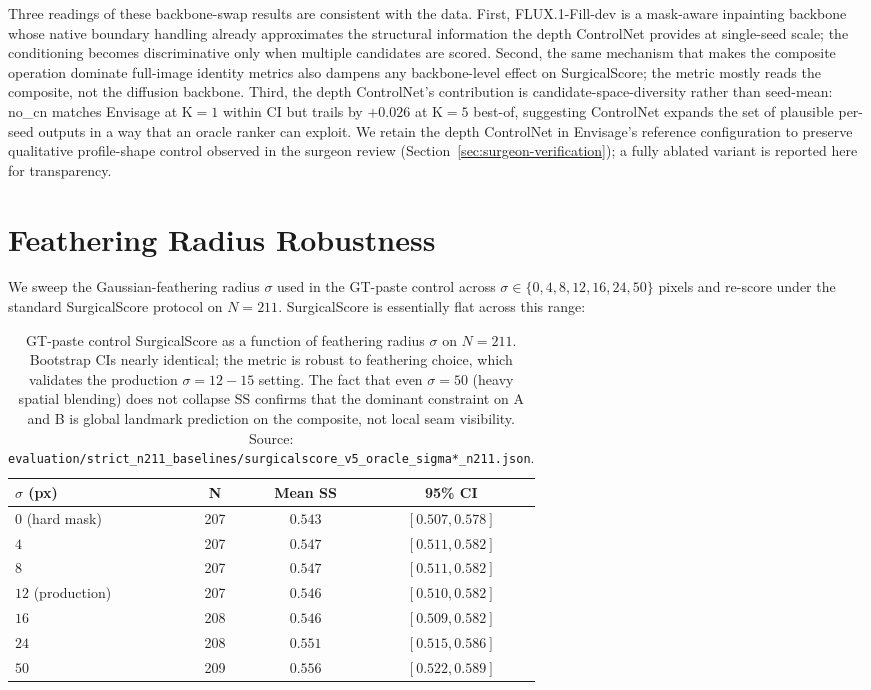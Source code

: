 \documentclass{article}
\newcommand{\method}{Envisage}
\begin{document}
\noindent Three readings of these backbone-swap results are consistent with
the data. First, FLUX.1-Fill-dev is a mask-aware inpainting backbone whose
native boundary handling already approximates the structural information
the depth ControlNet provides at single-seed scale; the conditioning
becomes discriminative only when multiple candidates are scored. Second,
the same mechanism that makes the composite operation dominate full-image
identity metrics also dampens any backbone-level effect on SurgicalScore;
the metric mostly reads the composite, not the diffusion backbone.
Third, the depth ControlNet's contribution is candidate-space-diversity
rather than seed-mean: no\_cn matches \method{} at K$=1$ within CI but
trails by $+0.026$ at K$=5$ best-of, suggesting ControlNet expands the
set of plausible per-seed outputs in a way that an oracle ranker can
exploit. We retain the depth ControlNet in \method{}'s reference
configuration to preserve qualitative profile-shape control observed in
the surgeon review (Section~\ref{sec:surgeon-verification}); a fully
ablated variant is reported here for transparency.

\section{Feathering Radius Robustness}
\label{app:sigma_sweep}

We sweep the Gaussian-feathering radius $\sigma$ used in the GT-paste control
across $\sigma\in\{0,4,8,12,16,24,50\}$ pixels and re-score under the standard
SurgicalScore protocol on $N{=}211$. SurgicalScore is essentially
flat across this range:

\begin{table}[h]
\centering
\small
\caption{GT-paste control SurgicalScore as a function of feathering radius
$\sigma$ on $N{=}211$. Bootstrap CIs nearly identical; the metric is
robust to feathering choice, which validates the production
$\sigma{=}12{-}15$ setting. The fact that even $\sigma{=}50$ (heavy spatial
blending) does not collapse SS confirms that the dominant constraint on
A and B is global landmark prediction on the composite, not local seam
visibility. Source:
\texttt{evaluation/strict\_n211\_baselines/surgicalscore\_v5\_oracle\_sigma*\_n211.json}.}
\label{tab:sigma_sweep}
\begin{tabular}{@{}lccc@{}}
\toprule
\textbf{$\sigma$ (px)} & \textbf{N} & \textbf{Mean SS} & \textbf{95\% CI} \\
\midrule
$0$ (hard mask)  & 207 & $0.543$ & $[0.507, 0.578]$ \\
$4$              & 207 & $0.547$ & $[0.511, 0.582]$ \\
$8$              & 207 & $0.547$ & $[0.511, 0.582]$ \\
$12$ (production) & 207 & $0.546$ & $[0.510, 0.582]$ \\
$16$             & 208 & $0.546$ & $[0.509, 0.582]$ \\
$24$             & 208 & $0.551$ & $[0.515, 0.586]$ \\
$50$             & 209 & $0.556$ & $[0.522, 0.589]$ \\
\bottomrule
\end{tabular}
\end{table}
\end{document}
